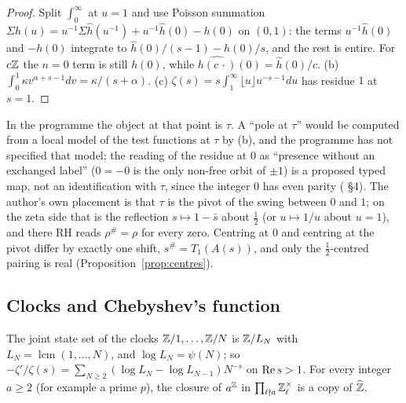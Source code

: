 \begin{proof}
Split $\int_0^\infty$ at $u=1$ and use Poisson summation $\Sigma h(u)=u^{-1}\Sigma\hat h(u^{-1})+u^{-1}\hat h(0)-h(0)$ on $(0,1)$: the terms $u^{-1}\hat h(0)$ and $-h(0)$ integrate to $\hat h(0)/(s-1)-h(0)/s$, and the rest is entire. For $c\mathbb{Z}$ the $n=0$ term is still $h(0)$, while $\widehat{h(c\,\cdot)}(0)=\hat h(0)/c$. (b) $\int_0^1\kappa v^{\alpha+s-1}dv=\kappa/(s+\alpha)$. (c) $\zeta(s)=s\int_1^\infty\lfloor u\rfloor u^{-s-1}du$ has residue $1$ at $s=1$.
\end{proof}

In the programme the object at that point is $\tau$. A ``pole at $\tau$'' would be computed from a local model of the test functions at $\tau$ by (b), and the programme has not specified that model; the reading of the residue at $0$ as ``presence without an exchanged label'' ($0=-0$ is the only non-free orbit of $\pm1$) is a proposed typed map, not an identification with $\tau$, since the integer $0$ has even parity ( §4). The author's own placement is that $\tau$ is the pivot of the swing between $0$ and $1$; on the zeta side that is the reflection $s\mapsto1-\bar s$ about $\tfrac12$ (or $u\mapsto1/u$ about $u=1$), and there RH reads $\rho^\#=\rho$ for every zero. Centring at $0$ and centring at the pivot differ by exactly one shift, $s^\#=T_1(A(s))$, and only the $\tfrac12$-centred pairing is real (Proposition~\ref{prop:centres}).

\subsection{Clocks and Chebyshev's function}

\begin{proposition}\label{prop:clocks}
The joint state set of the clocks $\mathbb{Z}/1,\dots,\mathbb{Z}/N$ is $\mathbb{Z}/L_N$ with $L_N=\operatorname{lcm}(1,\dots,N)$, and $\log L_N=\psi(N)$; so $-\zeta'/\zeta(s)=\sum_{N\ge2}(\log L_N-\log L_{N-1})N^{-s}$ on $\operatorname{Re} s>1$. For every integer $a\ge2$ (for example a prime $p$), the closure of $a^{\mathbb{Z}}$ in $\prod_{\ell\nmid a}\mathbb{Z}_\ell^\times$ is a copy of $\widehat{\mathbb{Z}}$.
\end{proposition}

